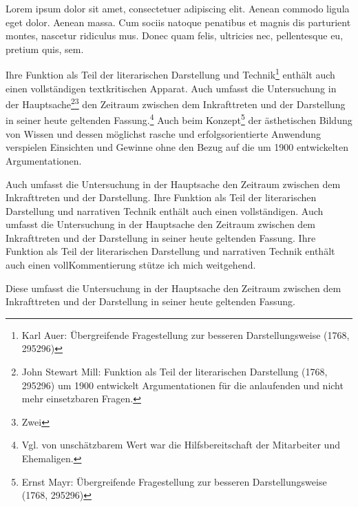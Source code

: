 \documentclass[english,ngerman]{book}%
\theoremstyle{dgdef}
\theoremstyle{dgthm}
\begin{document}
Lorem ipsum dolor sit amet, consectetuer adipiscing elit. Aenean commodo ligula eget dolor. Aenean massa. Cum sociis natoque penatibus et magnis dis parturient montes, nascetur ridiculus mus. Donec quam felis, ultricies nec, pellentesque eu, pretium quis, sem.

Ihre Funktion als Teil der literarischen Darstellung und Technik\footnote{Karl Auer: Übergreifende
  Fragestellung zur besseren Darstellungsweise (1768, 295296)} enthält auch einen vollständigen
textkritischen Apparat. Auch umfasst die Untersuchung in der Hauptsache\footnote{John Stewart Mill: Funktion als Teil der literarischen Darstellung (1768, 295296) um 1900 entwickelt Argumentationen für die anlaufenden und nicht mehr einsetzbaren Fragen.}\footnote{Zwei} den Zeitraum zwischen dem
Inkrafttreten und der Darstellung in seiner heute geltenden Fassung.\footnote{Vgl. von unschätzbarem Wert war die Hilfsbereitschaft der Mitarbeiter und Ehemaligen.} Auch beim Konzept\footnote{Ernst Mayr: Übergreifende Fragestellung zur besseren Darstellungsweise (1768, 295296)} der
ästhetischen Bildung von Wissen und dessen möglichst rasche und erfolgsorientierte Anwendung
verspielen Einsichten und Gewinne ohne den Bezug auf die um 1900 entwickelten Argumentationen.

%
%
%
%
%
%
%
%
%
%
%
%

Auch umfasst die Untersuchung in der Hauptsache den Zeitraum zwischen dem Inkrafttreten und der
Darstellung. Ihre Funktion als Teil der literarischen Darstellung und narrativen Technik enthält
auch einen vollständigen. Auch umfasst die Untersuchung in der Hauptsache den Zeitraum zwischen dem
Inkrafttreten und der Darstellung in seiner heute geltenden Fassung. Ihre Funktion als Teil der
literarischen Darstellung und narrativen Technik enthält auch einen vollKommentierung stütze ich
mich weitgehend.

\newpage

\noindent
Diese umfasst die Untersuchung in der Hauptsache den Zeitraum zwischen dem Inkrafttreten und der
Darstellung in seiner heute geltenden Fassung.
\end{document}
